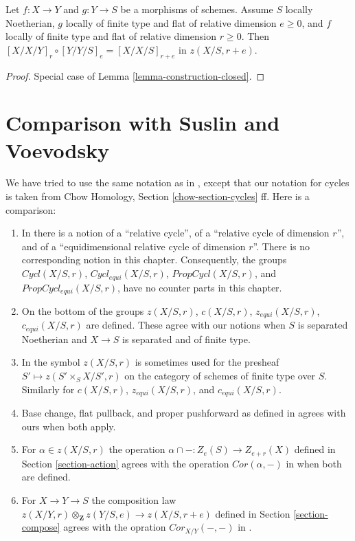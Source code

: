 \begin{lemma}
\label{lemma-composition-fundamental-cycles}
Let $f : X \to Y$ and $g : Y \to S$ be a morphisms of schemes.
Assume $S$ locally Noetherian, $g$ locally of finite type and
flat of relative dimension $e \ge 0$, and $f$ locally of finite type
and flat of relative dimension $r \geq 0$. Then
$[X/X/Y]_r \circ [Y/Y/S]_e = [X/X/S]_{r + e}$ in $z(X/S, r + e)$.
\end{lemma}

\begin{proof}
Special case of Lemma \ref{lemma-construction-closed}.
\end{proof}






\section{Comparison with Suslin and Voevodsky}
\label{section-compare}

\noindent
We have tried to use the same notation as in \cite{SV}, except that
our notation for cycles is taken from
Chow Homology, Section \ref{chow-section-cycles} ff.
Here is a comparison:
\begin{enumerate}
\item In \cite[Section 3.1]{SV} there is a notion of a
``relative cycle'', of a ``relative cycle of dimension $r$'', and
of a ``equidimensional relative cycle of dimension $r$''.
There is no corresponding notion in this chapter. Consequently, the groups
$Cycl(X/S, r)$, $Cycl_{equi}(X/S, r)$,
$PropCycl(X/S, r)$, and $PropCycl_{equi}(X/S, r)$,
have no counter parts in this chapter.
\item On the bottom of \cite[page 36]{SV} the groups
$z(X/S, r)$, $c(X/S, r)$, $z_{equi}(X/S, r)$, $c_{equi}(X/S, r)$
are defined. These agree with our notions when $S$ is separated
Noetherian and $X \to S$ is separated and of finite type.
\item In \cite{SV} the symbol $z(X/S, r)$ is sometimes used for the
presheaf $S' \mapsto z(S' \times_S X/S', r)$ on the category of schemes
of finite type over $S$. Similarly for
$c(X/S, r)$, $z_{equi}(X/S, r)$, and $c_{equi}(X/S, r)$.
\item Base change, flat pullback, and proper pushforward
as defined in \cite{SV} agrees with ours when both apply.
\item For $\alpha \in z(X/S, r)$ the operation
$\alpha \cap - : Z_e(S) \to Z_{e + r}(X)$ defined in
Section \ref{section-action} agrees with
the operation $Cor(\alpha, -)$ in \cite[Section 3.7]{SV}
when both are defined.
\item For $X \to Y \to S$ the composition law
$z(X/Y, r) \otimes_\mathbf{Z} z(Y/S, e) \longrightarrow z(X/S, r + e)$
defined in Section \ref{section-compose}
agrees with the opration $Cor_{X/Y}(-, -)$ in
\cite[Corollary 3.7.5]{SV}.
\end{enumerate}











